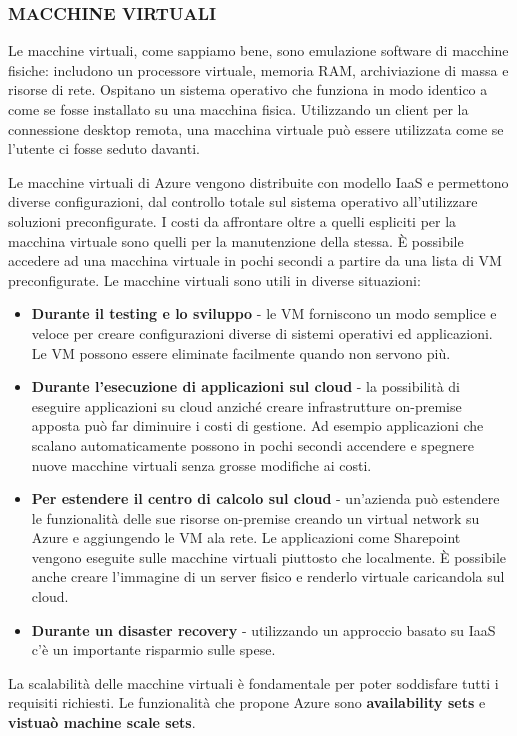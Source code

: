 \subsubsection{\textbf{MACCHINE VIRTUALI}}
Le macchine virtuali, come sappiamo bene, sono emulazione software di macchine fisiche: includono un processore virtuale, memoria RAM, archiviazione di massa e risorse di rete. Ospitano un sistema operativo che funziona in modo identico a come se fosse installato su una macchina fisica. Utilizzando un client per la connessione desktop remota, una macchina virtuale può essere utilizzata come se l'utente ci fosse seduto davanti.

\vspace{5mm}

Le macchine virtuali di Azure vengono distribuite con modello IaaS e permettono diverse configurazioni, dal controllo totale sul sistema operativo all'utilizzare soluzioni preconfigurate. I costi da affrontare oltre a quelli espliciti per la macchina virtuale sono quelli per la manutenzione della stessa. È possibile accedere ad una macchina virtuale in pochi secondi a partire da una lista di VM preconfigurate. Le macchine virtuali sono utili in diverse situazioni:
\begin{itemize}
    \item \textbf{Durante il testing e lo sviluppo} - le VM forniscono un modo semplice e veloce per creare configurazioni diverse di sistemi operativi ed applicazioni. Le VM possono essere eliminate facilmente quando non servono più.
    \item \textbf{Durante l'esecuzione di applicazioni sul cloud} - la possibilità di eseguire applicazioni su cloud anziché creare infrastrutture on-premise apposta può far diminuire i costi di gestione. Ad esempio applicazioni che scalano automaticamente possono in pochi secondi accendere e spegnere nuove macchine virtuali senza grosse modifiche ai costi. 
    \item \textbf{Per estendere il centro di calcolo sul cloud} - un'azienda può estendere le funzionalità delle sue risorse on-premise creando un virtual network su Azure e aggiungendo le VM ala rete. Le applicazioni come Sharepoint vengono eseguite sulle macchine virtuali piuttosto che localmente. È possibile anche creare l'immagine di un server fisico e renderlo virtuale caricandola sul cloud.
    \item \textbf{Durante un disaster recovery} - utilizzando un approccio basato su IaaS c'è un importante risparmio sulle spese.
\end{itemize}
La scalabilità delle macchine virtuali è fondamentale per poter soddisfare tutti i requisiti richiesti. Le funzionalità che propone Azure sono \textbf{availability sets} e \textbf{vistuaò machine scale sets}.

